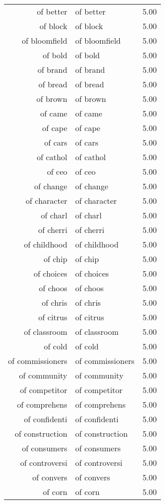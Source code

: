 \begin{table}[ht]
\begin{tabular}{rlr}
  of better & of better & 5.00 \\ 
  of block & of block & 5.00 \\ 
  of bloomfield & of bloomfield & 5.00 \\ 
  of bold & of bold & 5.00 \\ 
  of brand & of brand & 5.00 \\ 
  of bread & of bread & 5.00 \\ 
  of brown & of brown & 5.00 \\ 
  of came & of came & 5.00 \\ 
  of cape & of cape & 5.00 \\ 
  of cars & of cars & 5.00 \\ 
  of cathol & of cathol & 5.00 \\ 
  of ceo & of ceo & 5.00 \\ 
  of change & of change & 5.00 \\ 
  of character & of character & 5.00 \\ 
  of charl & of charl & 5.00 \\ 
  of cherri & of cherri & 5.00 \\ 
  of childhood & of childhood & 5.00 \\ 
  of chip & of chip & 5.00 \\ 
  of choices & of choices & 5.00 \\ 
  of choos & of choos & 5.00 \\ 
  of chris & of chris & 5.00 \\ 
  of citrus & of citrus & 5.00 \\ 
  of classroom & of classroom & 5.00 \\ 
  of cold & of cold & 5.00 \\ 
  of commissioners & of commissioners & 5.00 \\ 
  of community & of community & 5.00 \\ 
  of competitor & of competitor & 5.00 \\ 
  of comprehens & of comprehens & 5.00 \\ 
  of confidenti & of confidenti & 5.00 \\ 
  of construction & of construction & 5.00 \\ 
  of consumers & of consumers & 5.00 \\ 
  of controversi & of controversi & 5.00 \\ 
  of convers & of convers & 5.00 \\ 
  of corn & of corn & 5.00 \\ 

\end{tabular}
\end{table}
